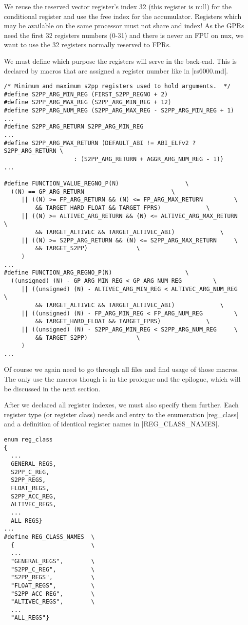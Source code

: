 We reuse the reserved vector register's index 32 (this register is null) for the conditional register and use the free index for the accumulator.
Registers which may be available on the same processor must not share and index!
As the GPRs need the first 32 registers numbers (0-31) and there is never an FPU on nux, we want to use the 32 registers normally reserved to FPRs.

We must define which purpose the registers will serve in the back-end.
This is declared by macros that are assigned a register number like in |rs6000.md|.
\begin{lstlisting}
/* Minimum and maximum s2pp registers used to hold arguments.  */
#define S2PP_ARG_MIN_REG (FIRST_S2PP_REGNO + 2)
#define S2PP_ARG_MAX_REG (S2PP_ARG_MIN_REG + 12)
#define S2PP_ARG_NUM_REG (S2PP_ARG_MAX_REG - S2PP_ARG_MIN_REG + 1)
...
#define S2PP_ARG_RETURN S2PP_ARG_MIN_REG
...
#define S2PP_ARG_MAX_RETURN (DEFAULT_ABI != ABI_ELFv2 ? S2PP_ARG_RETURN \
                    : (S2PP_ARG_RETURN + AGGR_ARG_NUM_REG - 1))
...

#define FUNCTION_VALUE_REGNO_P(N)                   \
  ((N) == GP_ARG_RETURN                         \
     || ((N) >= FP_ARG_RETURN && (N) <= FP_ARG_MAX_RETURN         \
         && TARGET_HARD_FLOAT && TARGET_FPRS)             \
     || ((N) >= ALTIVEC_ARG_RETURN && (N) <= ALTIVEC_ARG_MAX_RETURN   \
         && TARGET_ALTIVEC && TARGET_ALTIVEC_ABI)             \
     || ((N) >= S2PP_ARG_RETURN && (N) <= S2PP_ARG_MAX_RETURN     \
         && TARGET_S2PP)              \
     )
...
#define FUNCTION_ARG_REGNO_P(N)                     \
  ((unsigned) (N) - GP_ARG_MIN_REG < GP_ARG_NUM_REG         \
     || ((unsigned) (N) - ALTIVEC_ARG_MIN_REG < ALTIVEC_ARG_NUM_REG   \
         && TARGET_ALTIVEC && TARGET_ALTIVEC_ABI)             \
     || ((unsigned) (N) - FP_ARG_MIN_REG < FP_ARG_NUM_REG         \
         && TARGET_HARD_FLOAT && TARGET_FPRS)             \
     || ((unsigned) (N) - S2PP_ARG_MIN_REG < S2PP_ARG_NUM_REG     \
         && TARGET_S2PP)              \
     )
...
\end{lstlisting}

Of course we again need to go through all files and find usage of those macros.
The only use the macros though is in the prologue and the epilogue, which will be discussed in the next section.

After we declared all register indexes, we must also specify them further.
Each register type (or register class) needs and entry to the enumeration |reg_class| and a definition of identical register names in |REG_CLASS_NAMES|.
\begin{lstlisting}[multicols=2]
enum reg_class
{
  ...
  GENERAL_REGS,
  S2PP_C_REG,
  S2PP_REGS,
  FLOAT_REGS,
  S2PP_ACC_REG,
  ALTIVEC_REGS,
  ...
  ALL_REGS}
...
#define REG_CLASS_NAMES  \
  {                      \
  ...
  "GENERAL_REGS",        \
  "S2PP_C_REG",          \
  "S2PP_REGS",           \
  "FLOAT_REGS",          \
  "S2PP_ACC_REG",        \
  "ALTIVEC_REGS",        \
  ...
  "ALL_REGS"}
  \end{lstlisting}\unsure{in columns?}

